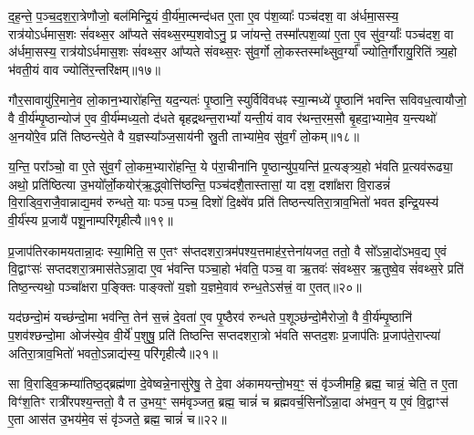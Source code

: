 द॒ह॒न्ते॒ प॒ञ्च॒द॒श॒रा॒त्रेणौजो॒ बल॑मिन्द्रि॒यं वी॒र्य॑मा॒त्मन्द॑धत ए॒ता ए॒व प॑श॒व्याः᳚ पञ्च॑दश॒ वा अ॑र्धमा॒सस्य॒ रात्र॑यो\-ऽ\-र्धमास॒शः सं॑वथ्स॒र आ᳚प्यते संवथ्स॒रम्प॒शवो\-ऽनु॒ प्र जा॑यन्ते॒ तस्मा᳚त्पश॒व्या॑ ए॒ता ए॒व सु॑व॒र्ग्याः᳚ पञ्च॑दश॒ वा अ॑र्धमा॒सस्य॒ रात्र॑यो\-ऽर्धमास॒शः सं॑वथ्स॒र आ᳚प्यते संवथ्स॒रः सु॑व॒र्गो लो॒कस्तस्मा᳚थ्सुव॒र्ग्या᳚ ज्योति॒र्गौरायु॒रिति॑ त्र्य॒हो भ॑वती॒यं वाव ज्योति॑र॒न्तरि॑क्षम्॥१७॥

गौर॒सावायु॑रि॒माने॒व लो॒कान॒भ्यारो॑हन्ति॒ यद॒न्यतः॑ पृ॒ष्ठानि॒ स्युर्विवि॑वधꣴ स्या॒न्मध्ये॑ पृ॒ष्ठानि॑ भवन्ति सविवध॒त्वायौजो॒ वै वी॒र्य॑म्पृ॒ष्ठान्योज॑ ए॒व वी॒र्य॑म्मध्य॒तो द॑धते बृहद्रथन्त॒रा\-भ्यां᳚ यन्ती॒यं वाव र॑थन्त॒रम॒सौ बृ॒हदा॒भ्यामे॒व य॒न्त्यथो॑ अ॒नयो॑रे॒व प्रति॑ तिष्ठन्त्ये॒ते वै य॒ज्ञस्या᳚ञ्ज॒साय॑नी स्रु॒ती ताभ्या॑मे॒व सु॑व॒र्गं लो॒कम्॥१८॥

य॒न्ति॒ परा᳚ञ्चो॒ वा ए॒ते सु॑व॒र्गं लो॒कम॒भ्यारो॑हन्ति॒ ये प॑रा॒चीना॑नि पृ॒ष्ठान्यु॑प॒यन्ति॑ प्र॒त्यङ्त्र्य॒हो भ॑वति प्र॒त्यव॑रूढ्या॒ अथो॒ प्रति॑ष्ठित्या उ॒भयो᳚र्लो॒कयोर्॑ऋ॒द्ध्वोत्ति॑ष्ठन्ति॒ पञ्च॑दशै॒तास्तासां॒ या दश॒ दशा᳚क्षरा वि॒राडन्नं॑ वि॒राड्वि॒राजै॒वान्नाद्य॒\-मव॑ रुन्धते॒ याः पञ्च॒ पञ्च॒ दिशो॑ दि॒क्ष्वे॑व प्रति॑ तिष्ठन्त्यतिरा॒त्राव॒भितो॑ भवत इन्द्रि॒यस्य॑ वी॒र्य॑स्य प्र॒जायै॑ पशू॒नाम्परि॑गृहीत्यै॥१९॥

{\anuvakamend[{ग॒च्छ॒न्त्य॒ग्नि॒ष्टुता॑ पा॒प्मान॒न्निर॒न्तरि॑क्षल्लोँ॒कं प्र॒जायै॒ द्वे च॑॥७॥}]}

प्र॒जाप॑तिरकामयतान्ना॒दः स्या॒मिति॒ स ए॒तꣳ स॑प्तदशरा॒त्रम॑पश्य॒त्तमाह॑र॒त्तेना॑यजत॒ ततो॒ वै सो᳚\-ऽन्ना॒दो॑\-ऽभव॒द्य ए॒वं वि॒द्वाꣳसः॑ सप्तदशरा॒त्रमास॑ते\-ऽन्ना॒दा ए॒व भ॑वन्ति पञ्चा॒हो भ॑वति॒ पञ्च॒ वा ऋ॒तवः॑ संवथ्स॒र ऋ॒तुष्वे॒व सं॑वथ्स॒रे प्रति॑ तिष्ठ॒न्त्यथो॒ पञ्चा᳚क्षरा प॒ङ्क्तिः पाङ्क्तो॑ य॒ज्ञो य॒ज्ञमे॒वाव॑ रुन्ध॒ते\-ऽस॑त्त्रं॒ वा ए॒तत्॥२०॥

यद॑छन्दो॒मं यच्छ॑न्दो॒मा भव॑न्ति॒ तेन॑ स॒त्त्रं दे॒वता॑ ए॒व पृ॒ष्ठैरव॑ रुन्धते प॒शूञ्छ॑न्दो॒मैरोजो॒ वै वी॒र्य॑म्पृ॒ष्ठानि॑ प॒शव॑श्छन्दो॒मा ओज॑स्ये॒व वी॒र्ये॑ प॒शुषु॒ प्रति॑ तिष्ठन्ति सप्तदशरा॒त्रो भ॑वति सप्तद॒शः प्र॒जाप॑तिः प्र॒जाप॑ते॒राप्त्या॑ अतिरा॒त्राव॒भितो॑ भवतो॒\-ऽन्नाद्य॑स्य॒ परि॑गृहीत्यै॥२१॥

{\anuvakamend[{ए॒तथ्स॒प्तत्रिꣳ॑श्चच्च॥८॥}]}

सा वि॒राड्वि॒क्रम्या॑तिष्ठ॒द्ब्रह्म॑णा दे॒वेष्वन्ने॒नासु॑रेषु॒ ते दे॒वा अ॑कामयन्तो॒भय॒ꣳ॒ सं वृ॑ञ्जीमहि॒ ब्रह्म॒ चान्नं॒ चेति॒ त ए॒ता विꣳ॑श॒तिꣳ रात्री॑रपश्य॒न्ततो॒ वै त उ॒भय॒ꣳ॒ सम॑वृञ्जत॒ ब्रह्म॒ चान्नं॑ च ब्रह्मवर्च॒सिनो᳚\-ऽन्ना॒दा अ॑भव॒न् य ए॒वं वि॒द्वाꣳस॑ ए॒ता आस॑त उ॒भय॑मे॒व सं वृ॑ञ्जते॒ ब्रह्म॒ चान्नं॑ च॥२२॥

